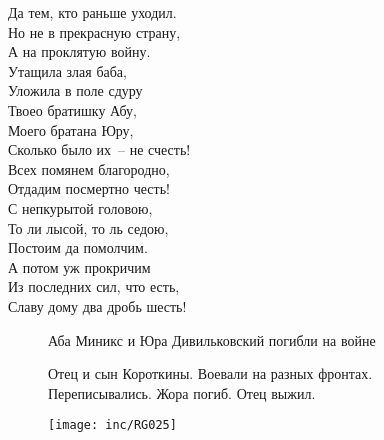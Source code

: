 {\begin{multicols}{2}
    Да тем, кто раньше уходил.\\
    Но не в прекрасную страну,\\
    А на проклятую войну.\\
    \vfill
    \noindent
    Утащила злая баба,\\
    Уложила в поле сдуру\\
    Твоео братишку Абу,\\
    Моего братана Юру,\\
    Сколько было их~-- не счесть!\\
    Всех помянем благородно,\\
    Отдадим посмертно честь!\\
    \vfill
    \noindent
    С непкурытой головою,\\
    То ли лысой, то ль седою,\\
    Постоим да помолчим.\\
    А потом уж прокричим\\
    Из последних сил, что есть,\\
    Славу дому два дробь шесть!\\
\end{multicols}
\vspace*{-5mm}
}


\restoregeometry


\begin{figure}[ht]
    \begin{minipage}[h!]{30mm}
    \end{minipage}
    \hfill
    \begin{minipage}[h!]{30mm}
    \end{minipage}

    \caption{Аба Миникс и Юра Дивильковский погибли на войне}
\end{figure}

\begin{figure}[h!]
    \begin{minipage}[h!]{40mm}
    \end{minipage}
    \hfill
    \begin{minipage}[h!]{40mm}
    \end{minipage}

    \caption{Отец и сын Короткины. Воевали на разных фронтах. Переписывались. Жора погиб. Отец выжил.}
\end{figure}



\begin{figure}
{\texttt{[image: inc/RG025]}}
\end{figure}

